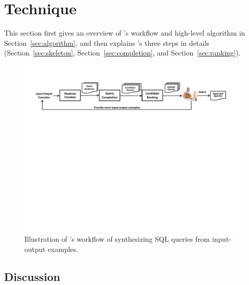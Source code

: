 
\section{Technique}
\label{sec:approach}

This section first gives an overview of \ourtool's
workflow and high-level algorithm in Section~\ref{sec:algorithm}, and
then explains \ourtool's three steps in details (Section~\ref{sec:skeleton},
Section~\ref{sec:completion}, and Section~\ref{sec:ranking}).



\begin{figure}[t]
  \centering
  \includegraphics[scale=0.65]{workflow}
  \vspace*{-2.0ex}\caption {{\label{fig:workflow} Illustration
  of \ourtool's workflow of synthesizing SQL queries from input-output examples. 
}}
\end{figure}

\vspace{-1mm}



\vspace{-1mm}




\vspace{-1mm}


\vspace{-1mm}



\vspace{-1mm}
\subsection{Discussion}
\label{sec:uim}

